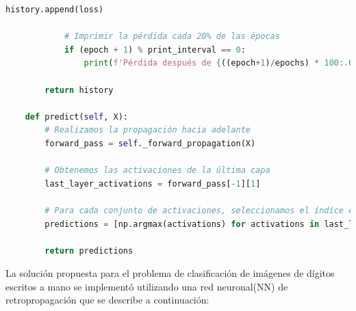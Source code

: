 \documentclass{article}
\begin{document}
\begin{lstlisting}[language=Python, caption={Red Neuronal Artificial}, label={lst:neural_network}]
            history.append(loss)

            # Imprimir la pérdida cada 20% de las épocas
            if (epoch + 1) % print_interval == 0:
                print(f'Pérdida después de {((epoch+1)/epochs) * 100:.0f}% de las épocas: {loss}')

        return history

    def predict(self, X):
        # Realizamos la propagación hacia adelante
        forward_pass = self._forward_propagation(X)

        # Obtenemos las activaciones de la última capa
        last_layer_activations = forward_pass[-1][1]

        # Para cada conjunto de activaciones, seleccionamos el índice con la mayor activación
        predictions = [np.argmax(activations) for activations in last_layer_activations]

        return predictions
    \end{lstlisting}
    La solución propuesta para el problema de clasificación de imágenes de dígitos escritos a mano se implementó utilizando una red neuronal(NN) de retropropagación que se describe a continuación:
\end{document}
